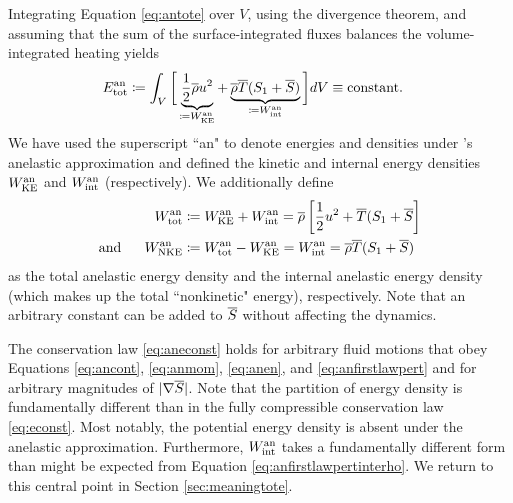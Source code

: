 \documentclass[12pt]{article}
\newcommand{\anetot}{E_{\rm tot}^{\rm an}}
\newcommand{\anwtot}{W^{\rm an}_{\rm tot}}
\newcommand{\anwke}{W^{\rm an}_{\rm KE}}
\newcommand{\anwnke}{W^{\rm an}_{\rm NKE}}
\newcommand{\anwint}{W^{\rm an}_{\rm int}}
\begin{document}
 Integrating Equation \eqref{eq:antote} over $V$, using the divergence theorem, and assuming that the sum of the surface-integrated fluxes balances the volume-integrated heating yields
\begin{align}\label{eq:aneconst}
	\anetot &\define \int_V \bigg{[}  \underbrace{\frac{1}{2}\rhoover u^2}_{\define \anwke} + \underbrace{\rhoover \tmpover (\entrone+\entrover)}_{\define\anwint} \bigg{]} dV \equiv \text{constant}.
\end{align}
 We have used the superscript ``an" to denote energies and densities under \citet{Gough1969}'s anelastic approximation and defined the kinetic and internal energy densities $\anwke$ and $\anwint$ (respectively). We additionally define
	\begin{subequations}\label{eq:anwtotnke}
	\begin{align}
		\anwtot &\define \anwke + \anwint = \rhoover\left[\frac{1}{2}u^2 + \tmpover(\entrone+\entrover \right]\label{eq:anwtot}\\
		\andd \anwnke &\define \anwtot - \anwke = \anwint =\rhoover \tmpover (\entrone+\entrover)\label{eq:anwnke}
	\end{align}
\end{subequations}
as the total anelastic energy density and the internal anelastic energy density (which makes up the total ``nonkinetic" energy), respectively. Note that an arbitrary constant can be added to $\overline{S}$ without affecting the dynamics. 

The conservation law \eqref{eq:aneconst} holds for arbitrary fluid motions that obey Equations \eqref{eq:ancont}, \eqref{eq:anmom}, \eqref{eq:anen}, and \eqref{eq:anfirstlawpert} and for arbitrary magnitudes of $|\nabla \overline{S}|$. Note that the partition of energy density is fundamentally different than in the fully compressible conservation law \eqref{eq:econst}. Most notably, the potential energy density is absent under the anelastic approximation. Furthermore, $\anwint$ takes a fundamentally different form than might be expected from Equation \eqref{eq:anfirstlawpertinterho}. We return to this central point in Section \ref{sec:meaningtote}. %
\end{document}
